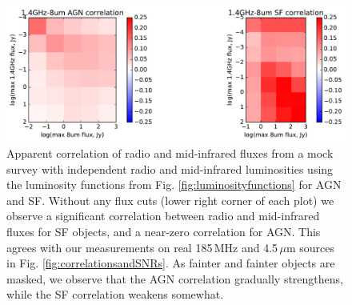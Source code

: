\documentclass[numberedappendix]{emulateapj}
\providecommand{\DIFaddbeginFL}{} %
\providecommand{\DIFaddendFL}{} %
\providecommand{\DIFdelbeginFL}{} %
\providecommand{\DIFdelendFL}{} %
\begin{document}
\begin{figure}[h]
\centering
\DIFdelbeginFL %
\DIFdelendFL \DIFaddbeginFL \includegraphics[width=6in]{chap5_xcor/sim_correlation_agn_and_sf.pdf}
\DIFaddendFL \caption[Apparent correlation of radio and mid-infrared fluxes from a mock survey.]{Apparent correlation of radio and mid-infrared fluxes from a mock survey with independent radio and mid-infrared luminosities using the luminosity functions from Fig. \ref{fig:luminosityfunctions} for AGN and SF. Without any flux cuts (lower right corner of each plot) we observe a significant correlation between radio and mid-infrared fluxes for SF objects, and a near-zero correlation for AGN. This agrees with our measurements on real 185\,MHz and 4.5\,$\mu$m sources in Fig. \ref{fig:correlationsandSNRs}. As fainter and fainter objects are masked, we observe that the AGN correlation gradually strengthens, while the SF correlation weakens somewhat. }
\label{fig:simagnlfcorrelations}
\end{figure}
\end{document}

